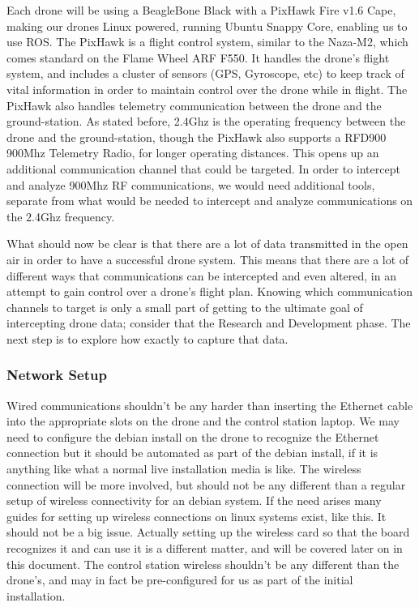 \documentclass[IEEEtran,letterpaper,10pt,notitlepage,draftclsnofoot,onecolumn]{article}
\begin{document}
Each drone will be using a BeagleBone Black with a PixHawk Fire v1.6 Cape, making our drones Linux powered, running
Ubuntu Snappy Core, enabling us to use ROS\cite{PixHawk}. The PixHawk is a flight control system, similar to the
Naza-M2, which comes standard on the Flame Wheel ARF F550. It handles the drone's flight system, and includes a cluster
of sensors (GPS, Gyroscope, etc) to keep track of vital information in order to maintain control over the drone while
in flight. The PixHawk also handles telemetry communication between the drone and the ground-station. As stated before,
2.4Ghz is the operating frequency between the drone and the ground-station, though the PixHawk also supports a RFD900
900Mhz Telemetry Radio, for longer operating distances\cite{PixHawkDocs}. This opens up an additional communication
channel that could be targeted. In order to intercept and analyze 900Mhz RF communications, we would need additional
tools, separate from what would be needed to intercept and analyze communications on the 2.4Ghz
frequency\cite{HakDaSpectrum900}.

What should now be clear is that there are a lot of data transmitted in the open air in order to have a successful
drone system. This means that there are a lot of different ways that communications can be intercepted and even
altered, in an attempt to gain control over a drone's flight plan. Knowing which communication channels to target
is only a small part of getting to the ultimate goal of intercepting drone data; consider that the Research and
Development phase. The next step is to explore how exactly to capture that data.

\subsubsection{Network Setup}
Wired communications shouldn't be any harder than inserting the Ethernet cable into the appropriate slots on the drone and the control station laptop. 
We may need to configure the debian install on the drone to recognize the Ethernet connection but it should be automated as part of the debian install, if it is anything like what a normal live installation media is like.
The wireless connection will be more involved, but should not be any different than a regular setup of wireless connectivity for an debian system. 
If the need arises many guides for setting up wireless connections on linux systems exist, like this. \cite{wirelessconfig} 
It should not be a big issue. 
Actually setting up the wireless card so that the board recognizes it and can use it is a different matter, and will be covered later on in this document. 
The control station wireless shouldn't be any different than the drone's, and may in fact be pre-configured for us as part of the initial installation.
\end{document}
